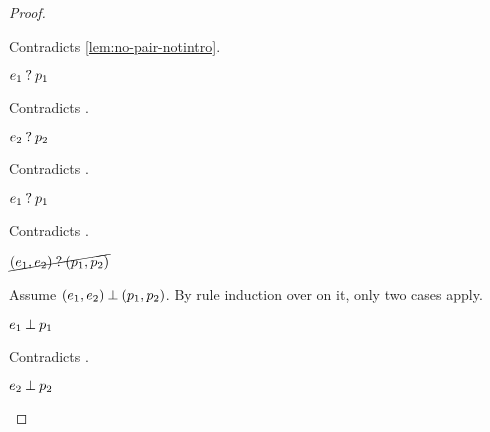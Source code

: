 \begin{proof}
\begin{byCases}
\begin{byCases}
\begin{byCases}
\begin{byCases}
                Contradicts \autoref{lem:no-pair-notintro}.
            \item[\text{(\ref{rule:MMPairL})}]
                \begin{pfsteps*}
                \item $e_1 \mathbin{?} p_1$ 
                \end{pfsteps*}
                Contradicts .
            \item[\text{(\ref{rule:MMPairR})}]
                \begin{pfsteps*}
                \item $e_2 \mathbin{?} p_2$ 
                \end{pfsteps*}
                Contradicts .
            \item[\text{(\ref{rule:MMPair})}]
                \begin{pfsteps*}
                \item $e_1 \mathbin{?} p_1$ 
                \end{pfsteps*}
                Contradicts .
            \end{byCases}
            \begin{pfsteps*}
            \item $\cancel{(e_1 , e_2) \mathbin{?} (p_1 , p_2)}$ 
            \end{pfsteps*}
            Assume $(e_1 , e_2) \mathbin{\bot} (p_1 , p_2)$. By rule induction over  on it, only two cases apply.
            \begin{byCases}
            \item[\text{(\ref{rule:NMPairL})}]
                \begin{pfsteps*}
                \item $e_1 \mathbin{\bot} p_1$ 
                \end{pfsteps*}
                Contradicts .
            \item[\text{(\ref{rule:NMPairR})}]
                \begin{pfsteps*}
                \item $e_2 \mathbin{\bot} p_2$ 
                \end{pfsteps*}

\end{byCases}
\end{byCases}
\end{byCases}
\end{byCases}
\end{proof}
